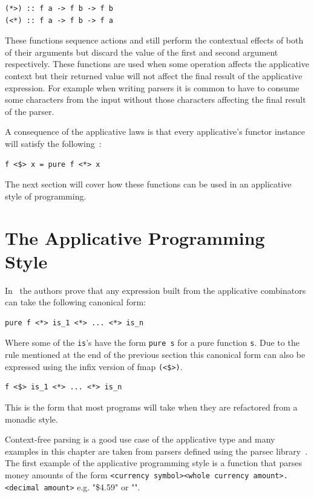 \begin{lstlisting}[frame=tblr]
(*>) :: f a -> f b -> f b
(<*) :: f a -> f b -> f a
\end{lstlisting}

These functions sequence actions and still perform the contextual effects of both of their arguments but discard the value of the first and second argument respectively. These functions are used when some operation affects the applicative context but their returned value will not affect the final result of the applicative expression. For example when writing parsers it is common to have to consume some characters from the input without those characters affecting the final result of the parser.

A consequence of the applicative laws is that every applicative's functor instance will satisfy the following~\citep{control.applicative}: 

\begin{lstlisting}[frame=tblr]
f <$> x = pure f <*> x
\end{lstlisting}

The next section will cover how these functions can be used in an applicative style of programming. 

\section{The Applicative Programming Style}
\label{sec:appProgStyle}

In~\citep{mcbrideIdioms} the authors prove that any expression built from the applicative combinators can take the following canonical form:

\begin{lstlisting}[frame=tblr]
pure f <*> is_1 <*> ... <*> is_n
\end{lstlisting}


Where some of the \texttt{is}'s have the form \texttt{pure s} for a pure function \texttt{s}. Due to the rule mentioned at the end of the previous section this canonical form can also be expressed using the infix version of fmap \texttt{(<\$>)}. 

\begin{lstlisting}[frame=tblr]
f <$> is_1 <*> ... <*> is_n
\end{lstlisting}

This is the form that most programs will take when they are refactored from a monadic style. 


 Context-free parsing is a good use case of the applicative type and many examples in this chapter are taken from parsers defined using the parsec library~\citep{parsec}. The first example of the applicative programming style is a function that parses money amounts of the form \texttt{<currency symbol><whole currency amount>.<decimal amount>} e.g. "\$4.59" or "".
 
